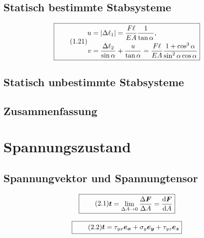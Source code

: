 \documentclass[11pt]{article}
\newcommand{\1}{ {\mathds{1}} }
\newcommand{\abs}[1]{\lvert#1\rvert}
\begin{document}
		\subsection{Statisch bestimmte Stabsysteme}

		\begin{equation}
			\boxed{
				\tag{1.21}
				\begin{split}
					u
					&=
					\abs{\Delta\ell_1}
					=
					\frac{F\ell}{EA}
					\frac{1}{\tan{\alpha}}
					,\\
					v
					&=
					\frac{\Delta\ell_2}{\sin{\alpha}}
					+
					\frac{u}{\tan{\alpha}}
					=
					\frac{F\ell}{EA}
					\frac{1 + \cos^3\alpha}{\sin^2\alpha \cos \alpha}
				\end{split}
			}
		\end{equation}


		\subsection{Statisch unbestimmte Stabsysteme}

		\subsection{Zusammenfassung}
		
		\section{Spannungszustand}
		\subsection{Spannungvektor und Spannungtensor}

		\begin{equation}
			\boxed{
				\tag{2.1}
				\begin{split}
					\boldsymbol{t}
					=
					\lim_{\Delta A \rightarrow 0}
					\frac{\Delta \boldsymbol{F}}{\Delta A}
					=
					\frac{\text{d}\boldsymbol{F}}{\text{d}A}
				\end{split}
			}
		\end{equation}

		\begin{equation}
			\boxed{
				\tag{2.2}
				\begin{split}
					\boldsymbol{t}
					=
					\tau_{yx} \boldsymbol{e_x}
					+
					\sigma_y	\boldsymbol{e_y}
					+
					\tau_{yz} \boldsymbol{e_z}
				\end{split}
			}
		\end{equation}
\end{document}
